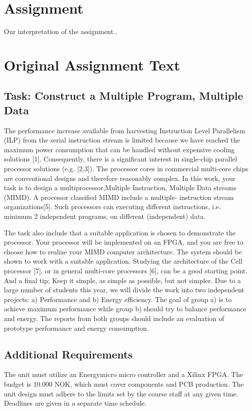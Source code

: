 \section{Assignment}

Our interpretation of the assignment..

\section{Original Assignment Text}

\subsection{Task: Construct a Multiple Program, Multiple Data}
The performance increase available from harvesting Instruction Level Parallelism
(ILP) from the serial instruction stream is limited because we have reached the
maximum power consumption that can be handled without expensive cooling
solutions [1]. Consequently, there is a significant interest in single-chip
parallel processor solutions (e.g. [2,3]). The processor cores in commercial
multi-core chips are conventional designs and therefore reasonably complex. In
this work, your task is to design a multiprocessor,Multiple Instruction,
Multiple Data streams (MIMD). A processor classified MIMD include a multiple-
instruction stream organizations[5]. Such processors can executing different
instructions, i.e. minimum 2 independent programs, on different (independent)
data.

The task also include that a suitable application is chosen to demonstrate the
processor. Your processor will be implemented on an FPGA, and you are free to
choose how to realize your MIMD computer architecture. The system should be
shown to work with a suitable application. Studying the architecture of the
Cell processor [7], or in general multi-core processors [6], can be a good
starting point. And a final tip; Keep it simple, as simple as possible, but not
simpler. Due to a large number of students this year, we will divide the work
into two independent projects: a) Performance and b) Energy efficiency. The goal
of group a) is to achieve maximum performance while group b) should try to
balance performance and energy. The reports from both groups should include an
evaluation of prototype performance and energy consumption.

\subsection{Additional Requirements}
The unit must utilize an Energymicro micro controller and a Xilinx FPGA. The
budget is 10.000 NOK, which must cover components and PCB production. The unit
design must adhere to the limits set by the course staff at any given time.
Deadlines are given in a separate time schedule.

